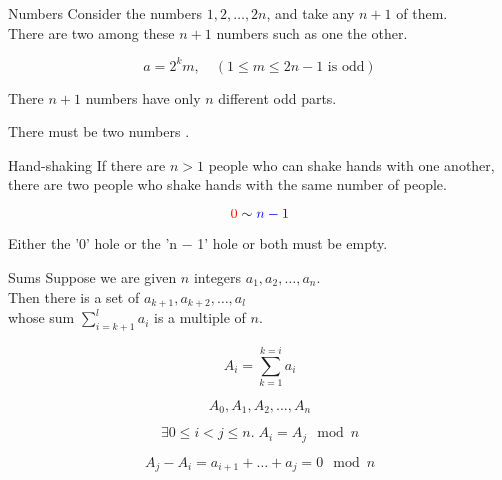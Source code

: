 \begin{frame}{}
  \begin{exampleblock}{Numbers}
    Consider the numbers $1, 2, \dots, 2n$, and take any $n+1$ of them. \\
    There are two among these $n+1$ numbers such as one  the other.
  \end{exampleblock}

  \pause
  \vspace{0.30cm}
  \begin{center}
    \[
      a = 2^{k} m, \quad (1 \le m \le 2n-1 \text{ is odd})
    \]

    There $n+1$ numbers have only $n$ different odd parts.

    \vspace{0.30cm}
    There must be two numbers .
  \end{center}
\end{frame}

\begin{frame}{}
  \begin{exampleblock}{Hand-shaking}
    If there are $n > 1$ people who can shake hands with one another, \\
    there are two people who shake hands with the same number of people.
  \end{exampleblock}

  \pause
  \[
    \textcolor{red}{0} \sim \textcolor{blue}{n-1}
  \]

  \pause
  \vspace{0.30cm}
  \begin{center}
    Either the '0' hole or the 'n − 1' hole or both must be empty.
  \end{center}
\end{frame}

\begin{frame}{}
  \begin{exampleblock}{Sums}
    Suppose we are given $n$ integers $a_{1}, a_{2}, \dots, a_{n}$. \\
    Then there is a set of 
    $a_{k+1}, a_{k+2}, \dots, a_{l}$ \\
    whose sum $\sum_{i=k+1}^{l} a_{i}$ is a multiple of $n$.
  \end{exampleblock}

  \pause
  \[
    A_{i} = \sum_{k=1}^{k=i} a_{i}
  \]

  \pause
  \[
    A_{0}, A_{1}, A_{2}, \dots, A_{n}
  \]

  \pause
  \[
    \exists 0 \le i < j \le n.\; A_{i} = A_{j} \mod{n}
  \]

  \pause
  \[
    A_{j} - A_{i} = a_{i+1} + \dots + a_{j} = 0 \mod{n}
  \]
\end{frame}

